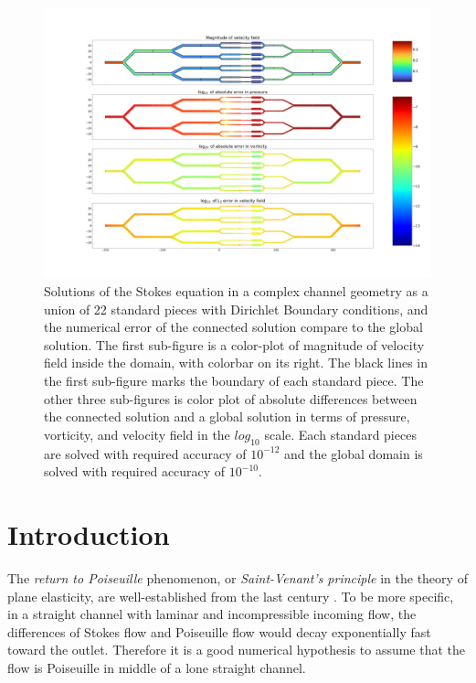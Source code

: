 \documentclass[10pt,twocolumn]{article}
\begin{document}
\begin{figure}[t] 
  \centering
  \includegraphics[width=\textwidth]{pic/connection-error-rough.png}
  \caption{Solutions of the Stokes equation in a complex channel geometry as a union of 22 standard pieces
    with Dirichlet Boundary conditions, 
    and the numerical error of the connected solution compare to the global solution. 
    The first sub-figure is a color-plot of magnitude of velocity field inside the 
    domain, with colorbar on its right. The black lines in the 
    first sub-figure marks the boundary of each standard piece. 
    The other three sub-figures is color plot of absolute differences 
    between the connected solution and a global solution in terms of pressure, 
    vorticity, and velocity field in the $log_{10}$ scale. Each standard pieces are solved
    with required accuracy of $10^{-12}$ and the global domain is solved with 
    required accuracy of $10^{-10}$.}
  \label{fig:connection-error}

\end{figure}

\section{Introduction}


The \textit{return to Poiseuille} phenomenon, or \textit{Saint-Venant's principle} in the theory of plane elasticity, 
are well-established from the last century 
\cite{coRecentDevelopmentsConcerning1983,gregoryTractionBoundaryValue1980,horganDECAYESTIMATESBIHARMONIC1989}. 
To be more specific, in a straight channel with laminar and incompressible incoming flow, the differences of Stokes flow and Poiseuille flow would decay exponentially fast toward the outlet. 
Therefore it is a good numerical hypothesis to assume that the flow is Poiseuille in middle of a lone straight channel.
\end{document}
